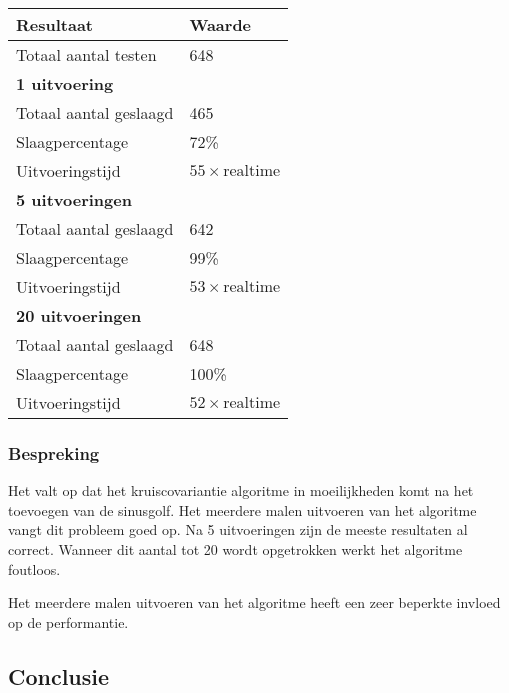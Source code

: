 \begin{tabular}{ l  l}
	\hline
	\textbf{Resultaat} & \textbf{Waarde} \\
	\hline
	Totaal aantal testen & 648 \\
	\textbf{1 uitvoering} & \\
	\hspace{0.5cm}Totaal aantal geslaagd & 465 \\
	\hspace{0.5cm}Slaagpercentage & 72\% \\
	\hspace{0.5cm}Uitvoeringstijd & $55 \times \textrm{realtime}$ \\
	\textbf{5 uitvoeringen} & \\
	\hspace{0.5cm}Totaal aantal geslaagd & 642 \\
	\hspace{0.5cm}Slaagpercentage & 99\% \\
	\hspace{0.5cm}Uitvoeringstijd & $53 \times \textrm{realtime}$ \\
	\textbf{20 uitvoeringen} & \\
	\hspace{0.5cm}Totaal aantal geslaagd & 648 \\
	\hspace{0.5cm}Slaagpercentage & 100\% \\
	\hspace{0.5cm}Uitvoeringstijd & $52 \times \textrm{realtime}$ \\
\end{tabular}

\subsubsection{Bespreking}

Het valt op dat het kruiscovariantie algoritme in moeilijkheden komt na het toevoegen van de sinusgolf. Het meerdere malen uitvoeren van het algoritme vangt dit probleem goed op. Na 5 uitvoeringen zijn de meeste resultaten al correct. Wanneer dit aantal tot 20 wordt opgetrokken werkt het algoritme foutloos. 

Het meerdere malen uitvoeren van het algoritme heeft een zeer beperkte invloed op de performantie.

\subsection{Conclusie}

